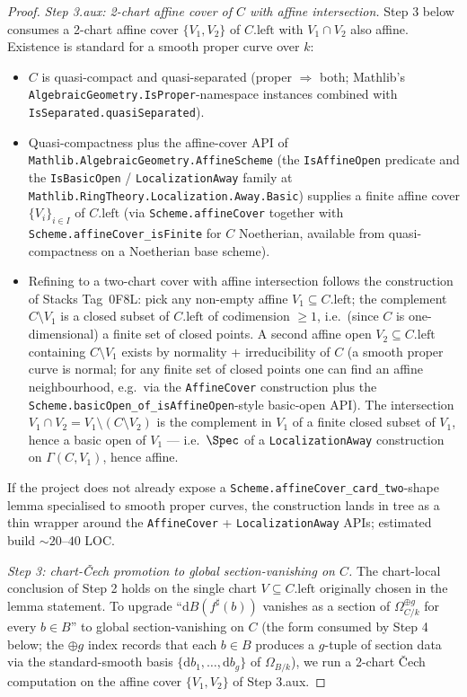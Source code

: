\begin{proof}
  \emph{Step 3.aux: 2-chart affine cover of \(C\) with affine intersection.} Step 3 below consumes a 2-chart affine cover \(\{V_1, V_2\}\) of \(C.\mathrm{left}\) with \(V_1 \cap V_2\) also affine. Existence is standard for a smooth proper curve over \(k\):
  \begin{itemize}
    \item \(C\) is quasi-compact and quasi-separated (proper \(\Rightarrow\) both; Mathlib's \texttt{AlgebraicGeometry.IsProper}-namespace instances combined with \texttt{IsSeparated.quasiSeparated}).
    \item Quasi-compactness plus the affine-cover API of \texttt{Mathlib.AlgebraicGeometry.AffineScheme} (the \texttt{IsAffineOpen} predicate and the \texttt{IsBasicOpen} / \texttt{LocalizationAway} family at \texttt{Mathlib.RingTheory.Localization.Away.Basic}) supplies a finite affine cover \(\{V_i\}_{i \in I}\) of \(C.\mathrm{left}\) (via \texttt{Scheme.affineCover} together with \texttt{Scheme.affineCover\_isFinite} for \(C\) Noetherian, available from quasi-compactness on a Noetherian base scheme).
    \item Refining to a two-chart cover with affine intersection follows the construction of Stacks Tag~0F8L: pick any non-empty affine \(V_1 \subseteq C.\mathrm{left}\); the complement \(C \setminus V_1\) is a closed subset of \(C.\mathrm{left}\) of codimension \(\geq 1\), i.e.\ (since \(C\) is one-dimensional) a finite set of closed points. A second affine open \(V_2 \subseteq C.\mathrm{left}\) containing \(C \setminus V_1\) exists by normality + irreducibility of \(C\) (a smooth proper curve is normal; for any finite set of closed points one can find an affine neighbourhood, e.g.\ via the \texttt{AffineCover} construction plus the \texttt{Scheme.basicOpen\_of\_isAffineOpen}-style basic-open API). The intersection \(V_1 \cap V_2 = V_1 \setminus (C \setminus V_2)\) is the complement in \(V_1\) of a finite closed subset of \(V_1\), hence a basic open of \(V_1\) — i.e.\ \(\Spec\) of a \texttt{LocalizationAway} construction on \(\Gamma(C, V_1)\), hence affine.
  \end{itemize}
  If the project does not already expose a \texttt{Scheme.affineCover\_card\_two}-shape lemma specialised to smooth proper curves, the construction lands in tree as a thin wrapper around the \texttt{AffineCover} + \texttt{LocalizationAway} APIs; estimated build \(\sim 20\)--\(40\) LOC.

  \emph{Step 3: chart-\v Cech promotion to global section-vanishing on \(C\).} The chart-local conclusion of Step 2 holds on the single chart \(V \subseteq C.\mathrm{left}\) originally chosen in the lemma statement. To upgrade ``\(\mathrm dB(f^{\sharp}(b))\) vanishes as a section of \(\Omega_{C/k}^{\oplus g}\) for every \(b \in B\)'' to global section-vanishing on \(C\) (the form consumed by Step 4 below; the \(\oplus g\) index records that each \(b \in B\) produces a \(g\)-tuple of section data via the standard-smooth basis \(\{\mathrm db_1, \ldots, \mathrm db_g\}\) of \(\Omega_{B/k}\)), we run a 2-chart \v Cech computation on the affine cover \(\{V_1, V_2\}\) of Step 3.aux.


\end{proof}
